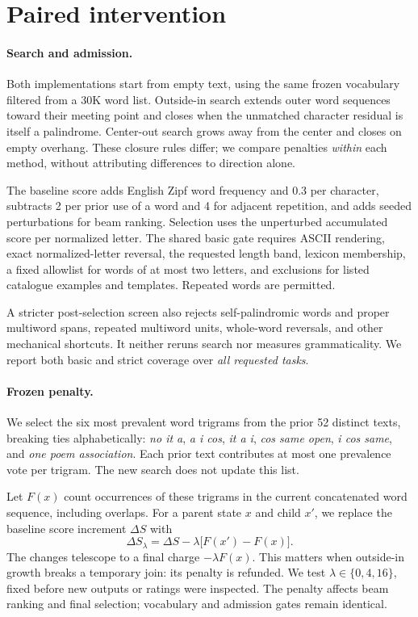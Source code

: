\documentclass[11pt]{article}
\begin{document}
\section{Paired intervention}
\paragraph{Search and admission.}
Both implementations start from empty text, using the same frozen vocabulary filtered from a 30K word list. Outside-in search extends outer word sequences toward their meeting point and closes when the unmatched character residual is itself a palindrome. Center-out search grows away from the center and closes on empty overhang. These closure rules differ; we compare penalties \emph{within} each method, without attributing differences to direction alone.

The baseline score adds English Zipf word frequency \citep{speer-2022-wordfreq} and 0.3 per character, subtracts 2 per prior use of a word and 4 for adjacent repetition, and adds seeded perturbations for beam ranking. Selection uses the unperturbed accumulated score per normalized letter. The shared basic gate requires ASCII rendering, exact normalized-letter reversal, the requested length band, lexicon membership, a fixed allowlist for words of at most two letters, and exclusions for listed catalogue examples and templates. Repeated words are permitted.

A stricter post-selection screen also rejects self-palindromic words and proper multiword spans, repeated multiword units, whole-word reversals, and other mechanical shortcuts. It neither reruns search nor measures grammaticality. We report both basic and strict coverage over \emph{all requested tasks}.

\paragraph{Frozen penalty.}
We select the six most prevalent word trigrams from the prior 52 distinct texts, breaking ties alphabetically: \emph{no it a}, \emph{a i cos}, \emph{it a i}, \emph{cos same open}, \emph{i cos same}, and \emph{one poem association}. Each prior text contributes at most one prevalence vote per trigram. The new search does not update this list.

Let $F(x)$ count occurrences of these trigrams in the current concatenated word sequence, including overlaps. For a parent state $x$ and child $x'$, we replace the baseline score increment $\Delta S$ with
\begin{equation}
\Delta S_\lambda=\Delta S-\lambda\bigl[F(x')-F(x)\bigr].
\end{equation}
The changes telescope to a final charge $-\lambda F(x)$. This matters when outside-in growth breaks a temporary join: its penalty is refunded. We test $\lambda\in\{0,4,16\}$, fixed before new outputs or ratings were inspected. The penalty affects beam ranking and final selection; vocabulary and admission gates remain identical.
\end{document}
